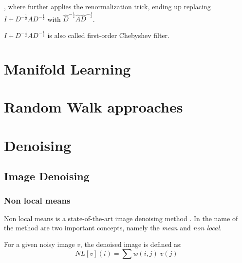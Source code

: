 , where \citet{GCN} further applies the renormalization trick, ending up replacing
$I + D^{-\frac{1}{2}} A D^{-\frac{1}{2}}$ with $\hat{D}^{-\frac{1}{2}} \hat{A} \hat{D}^{-\frac{1}{2}}$.

$I + D^{-\frac{1}{2}} A D^{-\frac{1}{2}}$ is also called first-order Chebyshev filter.






\cite{GCN}
\cite{simpleGCN}
\cite{dynamicGCN}



\section{Manifold Learning}
\cite{isomap}
\cite{LLE}
\cite{LaplacianEigenmaps}

\section{Random Walk approaches}

\cite{diffusionMaps}
\cite{vectorDiffusionMaps}
\cite{multiDiffusionMaps}


\section{Denoising}

\subsection{Image Denoising}

\subsubsection{Non local means}
Non local means is a state-of-the-art image denoising method \cite{noneLocalMean}.
In the name of the method are two important concepts, namely the \textit{mean}
and \textit{non local}.

For a given noisy image $v$, the denoised image is defined as:
\begin{equation}
    NL[v](i) = \sum{w(i,j) \; v(j)}
\end{equation}

